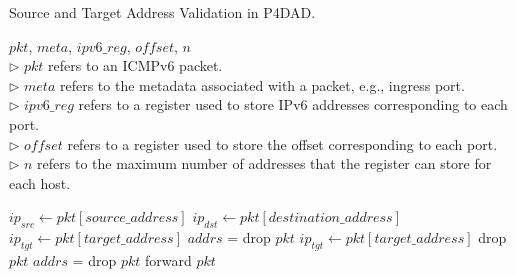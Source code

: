 \documentclass[journal]{IEEEtran}
\begin{document}
        \begin{algorithm}[!t]
        \caption{Source and Target Address Validation in P4DAD.}
        \label{alg:validation}
            \begin{algorithmic}[1]
            \Require $pkt$, $meta$, $ipv6\_reg$, $offset$, $n$\\
            $\triangleright$ $pkt$ refers to an ICMPv6 packet.\\
            $\triangleright$ $meta$ refers to the metadata associated with a packet, e.g., ingress port.\\
            $\triangleright$ $ipv6\_reg$ refers to a register used to store IPv6 addresses corresponding to each port.\\
            $\triangleright$ $of\!\!f\!set$ refers to a register used to store the offset corresponding to each port.\\
            $\triangleright$ $n$ refers to the maximum number of addresses that the register can store for each host.

            \State $ip_{src} \gets pkt[source\_address]$
            \State $ip_{dst} \gets pkt[destination\_address]$ 
                \State $ip_{tgt} \gets pkt[target\_address]$
                    \State $addrs$\! = \!
                        \State drop $pkt$
                    \EndIf
                \EndIf
                \State $ip_{tgt} \gets pkt[target\_address]$
                    \State drop $pkt$
                \EndIf
                \State $addrs$\! = \!
                    \State drop $pkt$
                \EndIf
            \EndIf
            \State forward $pkt$


\end{algorithmic}
\end{algorithm}
\end{document}
